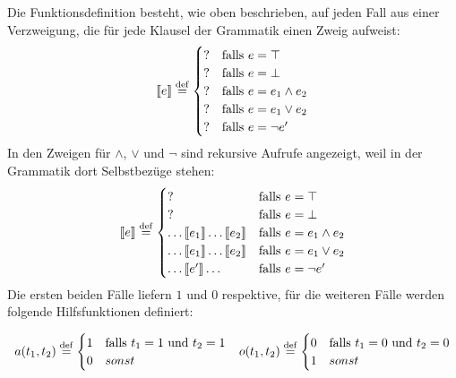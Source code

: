 Die Funktionsdefinition besteht, wie oben beschrieben, auf jeden Fall
aus einer Verzweigung, die für jede Klausel der Grammatik einen Zweig
aufweist:
%
\begin{displaymath}
  \llbracket e \rrbracket \stackrel{\rm def}{=}
  \begin{cases}
    ? & \textrm{falls } e = \top\\
    ? & \textrm{falls } e = \bot\\
    ? & 
    \textrm{falls } e =
    e_1\wedge e_2\\
    ? & 
    \textrm{falls } e =
    e_1\vee e_2\\
    ? & \textrm{falls } e = \neg e'
  \end{cases}
\end{displaymath}
%
In den Zweigen für $\wedge$, $\vee$ und $\neg$ sind rekursive Aufrufe
angezeigt, weil in der Grammatik dort Selbstbezüge stehen:
%
\begin{displaymath}
  \llbracket e \rrbracket \stackrel{\rm def}{=}
  \begin{cases}
    ? & \textrm{falls } e = \top\\
    ? & \textrm{falls } e = \bot\\
    \ldots \llbracket e_1\rrbracket\ldots\llbracket e_2\rrbracket  & 
    \textrm{falls } e =
    e_1\wedge e_2\\
    \ldots \llbracket e_1\rrbracket\ldots\llbracket e_2\rrbracket & 
    \textrm{falls } e =
    e_1\vee e_2\\
    \ldots \llbracket e'\rrbracket\ldots  & \textrm{falls } e = \neg e'
  \end{cases}
\end{displaymath}
%
Die ersten beiden Fälle liefern $1$ und $0$ respektive, für die
weiteren Fälle werden folgende Hilfsfunktionen definiert:

\begin{displaymath}
  \begin{array}{cc}
  a(t_1, t_2) \stackrel{\rm def}{=} 
  \begin{cases}
    1 & \textrm{falls } t_1 = 1 \textrm{ und } t_2 = 1\\
    0 & sonst
  \end{cases}
  &
  o(t_1, t_2) \stackrel{\rm def}{=} 
  \begin{cases}
    0 & \textrm{falls } t_1 = 0 \textrm{ und } t_2 = 0\\
    1 & sonst
  \end{cases}
\end{array}
\end{displaymath}

